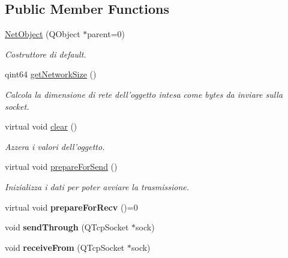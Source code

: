 \subsection*{Public Member Functions}
\begin{DoxyCompactItemize}
\item 
\hyperlink{class_k_cloud_1_1_net_object_aa793065ebe235c8173e70ee041353345}{Net\-Object} (Q\-Object $\ast$parent=0)
\begin{DoxyCompactList}\small\item\em Costruttore di default. \end{DoxyCompactList}\item 
qint64 \hyperlink{class_k_cloud_1_1_net_object_a44835b59c4c1658e3529a8e752f3a3ca}{get\-Network\-Size} ()
\begin{DoxyCompactList}\small\item\em Calcola la dimensione di rete dell'oggetto intesa come bytes da inviare sulla socket. \end{DoxyCompactList}\item 
virtual void \hyperlink{class_k_cloud_1_1_net_object_a19494b9dd2318325504a5d8ccc242c48}{clear} ()
\begin{DoxyCompactList}\small\item\em Azzera i valori dell'oggetto. \end{DoxyCompactList}\item 
virtual void \hyperlink{class_k_cloud_1_1_net_object_abe21fc2011a6d6565d464cec00400c5d}{prepare\-For\-Send} ()
\begin{DoxyCompactList}\small\item\em Inizializza i dati per poter avviare la trasmissione. \end{DoxyCompactList}\item 
\hypertarget{class_k_cloud_1_1_net_object_a38f4b8f98f670115b11f10aad9752783}{virtual void {\bfseries prepare\-For\-Recv} ()=0}\label{class_k_cloud_1_1_net_object_a38f4b8f98f670115b11f10aad9752783}

\item 
\hypertarget{class_k_cloud_1_1_net_object_a06c30b87300c8fa58b587315a049832f}{void {\bfseries send\-Through} (Q\-Tcp\-Socket $\ast$sock)}\label{class_k_cloud_1_1_net_object_a06c30b87300c8fa58b587315a049832f}

\item 
\hypertarget{class_k_cloud_1_1_net_object_a2a788886fd8402e478a56b317a3e86b5}{void {\bfseries receive\-From} (Q\-Tcp\-Socket $\ast$sock)}\label{class_k_cloud_1_1_net_object_a2a788886fd8402e478a56b317a3e86b5}


\end{DoxyCompactItemize}

